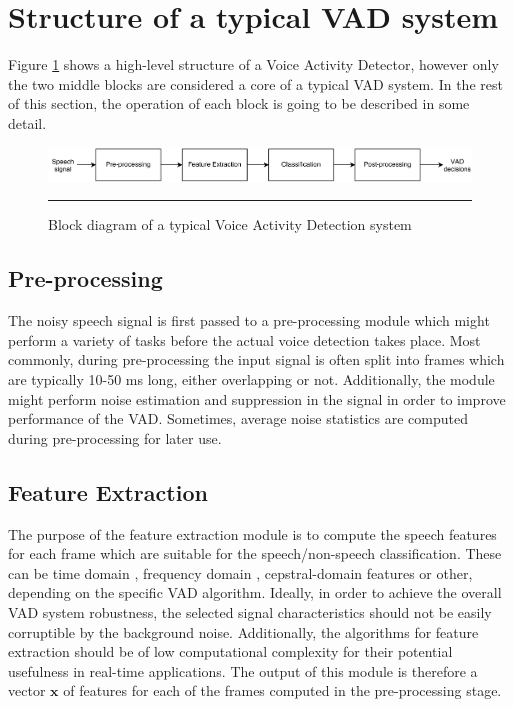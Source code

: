 \section{Structure of a typical VAD system}

Figure \ref{fig:VADStructure} shows a high-level structure of a Voice Activity Detector, however only the two middle blocks are considered a core of a typical VAD system. In the rest of this section, the operation of each block is going to be described in some detail. \bigskip

\begin{figure}[htbp]
	\centering
		\includegraphics[width=1.0\columnwidth]{Figures/Chapter1/VADStructure.png}
		\rule{37em}{0.5pt}
	\caption[Block diagram of a typical Voice Activity Detection system]{Block diagram of a typical Voice Activity Detection system}
	\label{fig:VADStructure}
\end{figure}

\subsection{Pre-processing}

The noisy speech signal is first passed to a pre-processing module which might perform a variety of tasks before the actual voice detection takes place. Most commonly, during pre-processing the input signal is often split into frames which are typically 10-50 ms long, either overlapping or not. Additionally, the module might perform noise estimation and suppression in the signal in order to improve performance of the VAD. Sometimes, average noise statistics are computed during pre-processing for later use.

\subsection{Feature Extraction}

The purpose of the feature extraction module is to compute the speech features for each frame which are suitable for the speech/non-speech classification. These can be time domain \cite{Kida, Weaver}, frequency domain \cite{Tuske, LTSD, Tan, PARADE, RamirezMulti, Sohn, SohnInitial, Renevey}, cepstral-domain \cite{Kotcher} features or other, depending on the specific VAD algorithm. Ideally, in order to achieve the overall VAD system robustness, the selected signal characteristics should not be easily corruptible by the background noise. Additionally, the algorithms for feature extraction should be of low computational complexity for their potential usefulness in real-time applications. The output of this module is therefore a vector $\mathbf{x}$ of features for each of the frames computed in the pre-processing stage.

